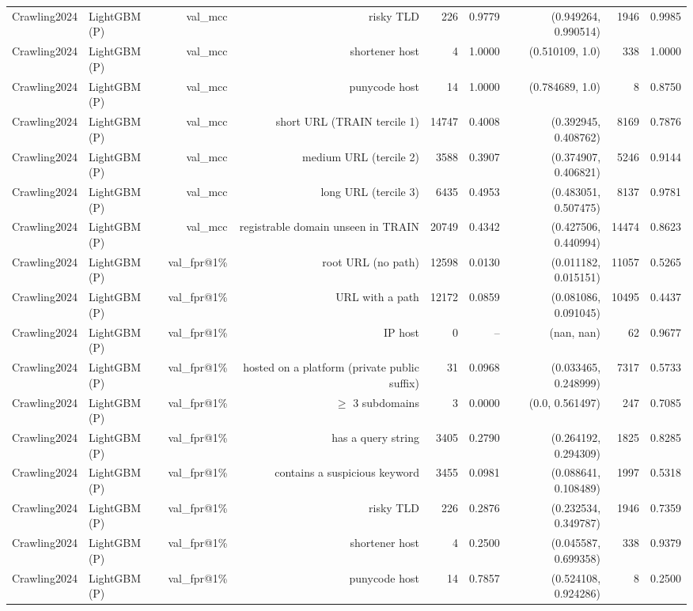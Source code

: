 \begin{table}[t]
\begin{tabular}{llrrrrrrr}
Crawling2024 & LightGBM (P) & val\_mcc & risky TLD & 226 & 0.9779 & (0.949264, 0.990514) & 1946 & 0.9985 \\
Crawling2024 & LightGBM (P) & val\_mcc & shortener host & 4 & 1.0000 & (0.510109, 1.0) & 338 & 1.0000 \\
Crawling2024 & LightGBM (P) & val\_mcc & punycode host & 14 & 1.0000 & (0.784689, 1.0) & 8 & 0.8750 \\
Crawling2024 & LightGBM (P) & val\_mcc & short URL (TRAIN tercile 1) & 14747 & 0.4008 & (0.392945, 0.408762) & 8169 & 0.7876 \\
Crawling2024 & LightGBM (P) & val\_mcc & medium URL (tercile 2) & 3588 & 0.3907 & (0.374907, 0.406821) & 5246 & 0.9144 \\
Crawling2024 & LightGBM (P) & val\_mcc & long URL (tercile 3) & 6435 & 0.4953 & (0.483051, 0.507475) & 8137 & 0.9781 \\
Crawling2024 & LightGBM (P) & val\_mcc & registrable domain unseen in TRAIN & 20749 & 0.4342 & (0.427506, 0.440994) & 14474 & 0.8623 \\
Crawling2024 & LightGBM (P) & val\_fpr@1\% & root URL (no path) & 12598 & 0.0130 & (0.011182, 0.015151) & 11057 & 0.5265 \\
Crawling2024 & LightGBM (P) & val\_fpr@1\% & URL with a path & 12172 & 0.0859 & (0.081086, 0.091045) & 10495 & 0.4437 \\
Crawling2024 & LightGBM (P) & val\_fpr@1\% & IP host & 0 & -- & (nan, nan) & 62 & 0.9677 \\
Crawling2024 & LightGBM (P) & val\_fpr@1\% & hosted on a platform (private public suffix) & 31 & 0.0968 & (0.033465, 0.248999) & 7317 & 0.5733 \\
Crawling2024 & LightGBM (P) & val\_fpr@1\% & $\geq$ 3 subdomains & 3 & 0.0000 & (0.0, 0.561497) & 247 & 0.7085 \\
Crawling2024 & LightGBM (P) & val\_fpr@1\% & has a query string & 3405 & 0.2790 & (0.264192, 0.294309) & 1825 & 0.8285 \\
Crawling2024 & LightGBM (P) & val\_fpr@1\% & contains a suspicious keyword & 3455 & 0.0981 & (0.088641, 0.108489) & 1997 & 0.5318 \\
Crawling2024 & LightGBM (P) & val\_fpr@1\% & risky TLD & 226 & 0.2876 & (0.232534, 0.349787) & 1946 & 0.7359 \\
Crawling2024 & LightGBM (P) & val\_fpr@1\% & shortener host & 4 & 0.2500 & (0.045587, 0.699358) & 338 & 0.9379 \\
Crawling2024 & LightGBM (P) & val\_fpr@1\% & punycode host & 14 & 0.7857 & (0.524108, 0.924286) & 8 & 0.2500 \\

\end{tabular}
\end{table}
